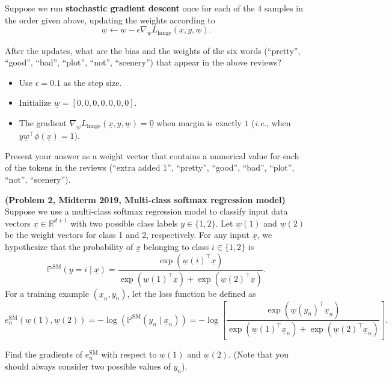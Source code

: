 \documentclass{article}
\newcommand{\probP}{\mathds{P}}
\theoremstyle{definition}
\begin{document}
\begin{question}[start=0]
		Suppose we run \textbf{stochastic gradient descent} once for each of the 4 samples in the order given above, updating the weights according to
		\begin{equation*}
			\underline{w} \leftarrow \underline{w} - \epsilon \nabla_{\underline{w}} L_{\text{hinge}}(\underline{x}, y, \underline{w}).
		\end{equation*}
		
		After the updates, what are the bias and the weights of the six words (``pretty'', ``good'', ``bad'', ``plot'', ``not'', ``scenery'') that appear in the above reviews?
		\begin{itemize}
			\item Use $\epsilon=0.1$ as the step size.
			\item Initialize $\underline{w}=[0,0,0,0,0,0,0]$.
			\item The gradient $\nabla_{\underline{w}} L_{\text{hinge}}(\underline{x}, y, \underline{w})=\underline{0}$ when margin is exactly $1$ (\emph{i.e.}, when $y\underline{w}^\top\phi(\underline{x}) = 1$).
		\end{itemize}
		
		Present your answer as a weight vector that contains a numerical value for each of the tokens in the reviews  (``extra added 1'', ``pretty'', ``good'', ``bad'', ``plot'', ``not'', ``scenery'').
	\item \textbf{(Problem 2, Midterm 2019, Multi-class softmax regression model)}
	Suppose we use a multi-class softmax regression model to classify input data vectors $\underline{x} \in \mathbb{R}^{d+1}$ with two possible class labels $y \in \{1, 2\}$. Let $\underline{w}(1)$ and $\underline{w}(2)$ be the weight vectors for class 1 and 2, respectively. For any input $\underline{x}$, we hypothesize that the probability of $\underline{x}$ belonging to class $i \in \{1, 2\}$ is
	\[
	\probP^{\text{SM}}(y = i\mid \underline{x}) = \frac{\exp(\underline{w}(i)^\top \underline{x})}{\exp(\underline{w}(1)^\top \underline{x}) + \exp(\underline{w}(2)^\top \underline{x})}.
	\]
	For a training example $(\underline{x}_n, y_n)$, let the loss function be defined as
	\[
	e^{\text{SM}}_{n}(\underline{w}(1), \underline{w}(2)) = -\log(\probP^{\text{SM}}(y_n\mid \underline{x}_n)) = -\log\left[\frac{\exp(\underline{w}(y_n)^\top \underline{x}_n)}{\exp(\underline{w}(1)^\top\underline{x}_n) + \exp(\underline{w}(2)^\top\underline{x}_n)}\right].
	\]
	\begin{question}
		\item Find the gradients of $e^{\text{SM}}_{n}$ with respect to $\underline{w}(1)$ and $\underline{w}(2)$. (Note that you should always consider two possible values of $y_n$).
		

\end{question}
\end{question}
\end{document}
